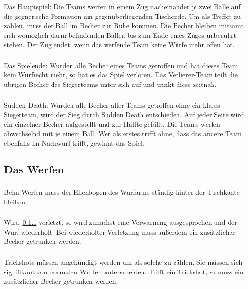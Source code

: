 \subsubsection{}
Das Hauptspiel: Die Teams werfen in einem Zug nacheinander je zwei Bälle auf die gegnerische Formation am gegenüberliegenden Tischende.
Um als Treffer zu zählen, muss der Ball im Becher zur Ruhe kommen.
Die Becher bleiben mitsamt sich womöglich darin befindenden Bällen bis zum Ende eines Zuges unberührt stehen.
Der Zug endet, wenn das werfende Team keine Würfe mehr offen hat.

\subsubsection{}
Das Spielende: Wurden alle Becher eines Teams getroffen und hat dieses Team kein Wurfrecht mehr, so hat es das Spiel verloren.
Das Verlierer-Team teilt die übrigen Becher des Siegerteams unter sich auf und trinkt diese zeitnah.

\subsubsection{}
\glqq{} Sudden Death\grqq{}: Wurden alle Becher aller Teams getroffen ohne ein klares Siegerteam, wird der Sieg durch Sudden Death entschieden.
Auf jeder Seite wird ein einzelner Becher aufgestellt und zur Hälfte gefüllt.
Die Teams werfen abwechselnd mit je einem Ball.
Wer als erstes trifft ohne, dass das andere Team ebenfalls im Nachwurf trifft, gewinnt das Spiel.

\subsection{Das Werfen}
\subsubsection{}\label{Bier-Pong:Werfen:Ellenbogen}
Beim Werfen muss der Ellenbogen des Wurfarms ständig hinter der Tischkante bleiben.

\subsubsection{}
Wird~\ref{Bier-Pong:Werfen:Ellenbogen} verletzt, so wird zunächst eine Verwarnung ausgesprochen und der Wurf wiederholt.
Bei wiederholter Verletzung muss außerdem ein zusätzlicher Becher getrunken werden.

\subsubsection{}
\glqq{} Trickshots\grqq{} müssen angekündigt werden um als solche zu zählen.
Sie müssen sich signifikant von normalen Würfen unterscheiden.
Trifft ein Trickshot, so muss ein zusätzlicher Becher getrunken werden.

